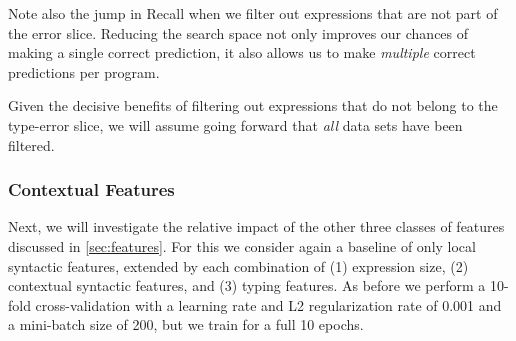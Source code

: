 Note also the jump in Recall when we filter out expressions that are not
part of the error slice.
%
Reducing the search space not only improves our chances of making a
single correct prediction, it also allows us to make \emph{multiple}
correct predictions per program.

Given the decisive benefits of filtering out expressions that do not
belong to the type-error slice, we will assume going forward that
\emph{all} data sets have been filtered.

\subsubsection{Contextual Features}
\label{sec:contextual-features}

Next, we will investigate the relative impact of the other three classes
of features discussed in \autoref{sec:features}.
%
For this we consider again a baseline of only local syntactic features,
extended by each combination of
%
(1) expression size,
(2) contextual syntactic features, and
(3) typing features.
%
As before we perform a 10-fold cross-validation with a learning rate and
L2 regularization rate of 0.001 and a mini-batch size of 200, but we
train for a full 10 epochs.

